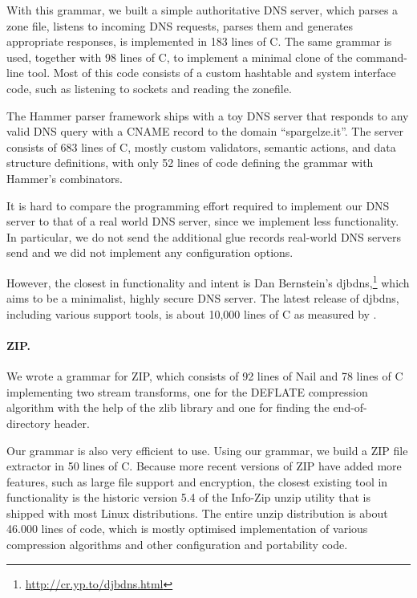   
With this grammar, we built a simple authoritative DNS server, which parses a zone file, listens to incoming DNS
requests, parses them and generates appropriate responses, is implemented in 183 lines of C. The
same grammar is used, together with 98 lines of C, to implement a minimal clone of the
 command-line tool. Most of this code consists of a custom hashtable and system
interface code, such as listening to sockets and reading the zonefile. 

The Hammer parser framework\cite{hammer-dns} ships with a toy DNS server that responds to
any valid DNS query with a CNAME record to the domain ``spargelze.it''. 
The server consists of 683 lines of C, mostly custom validators, semantic actions,
and data structure definitions, with only 52 lines of code defining the
grammar with Hammer's combinators.

It is hard to compare the programming effort required to implement
our DNS server to that of a real world DNS server, since we implement less functionality.
 In particular, we do not send the additional glue records real-world DNS servers send and
we did not implement any configuration options.

However, the closest in functionality and intent is Dan Bernstein's
djbdns,\footnote{\url{http://cr.yp.to/djbdns.html}} which aims to be
a minimalist, highly secure DNS server. The latest release of djbdns,
including various support tools, is about 10,000 lines of C as measured by
. 

\paragraph{ZIP.}


We wrote a grammar for ZIP, which consists of 92 lines of Nail and 78 lines of C implementing two
stream transforms, one for the DEFLATE compression algorithm with the help of the zlib library and
one for finding the end-of-directory header. 

Our grammar is also very efficient to use. Using our grammar, we build a ZIP file extractor in 50
lines of C. Because more recent versions of ZIP have added more features, such as large file support
and encryption, the closest existing tool in functionality is the historic version 5.4 of the Info-Zip unzip
utility\cite{infozip} that is shipped with most Linux distributions. The entire unzip distribution
is about 46.000 lines of code, which is mostly optimised implementation of various compression
algorithms and other configuration and portability code.

